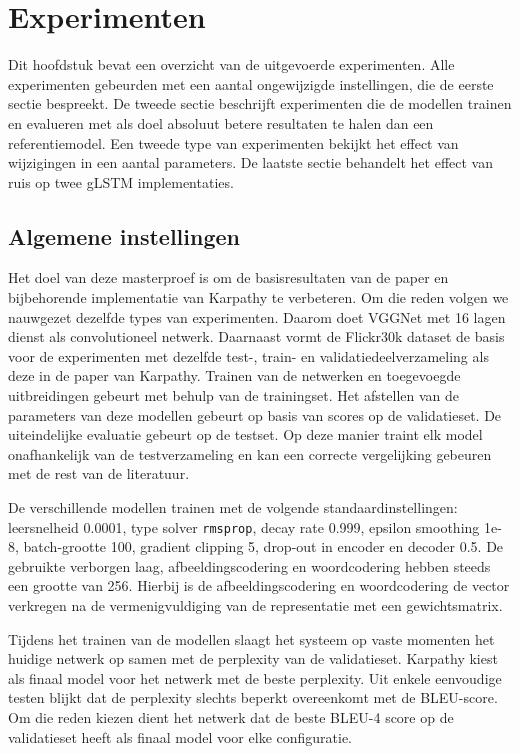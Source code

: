 \chapter{Experimenten} %
\label{cha:experimenten}
Dit hoofdstuk bevat een overzicht van de uitgevoerde experimenten. Alle experimenten gebeurden met een aantal ongewijzigde instellingen, die de eerste sectie bespreekt. De tweede sectie beschrijft experimenten die de modellen trainen en evalueren met als doel absoluut betere resultaten te halen dan een referentiemodel. Een tweede type van experimenten bekijkt het effect van wijzigingen in een aantal parameters. De laatste sectie behandelt het effect van ruis op twee gLSTM implementaties.

\section{Algemene instellingen} %
\label{sec:eigen_implementaties_exp}
Het doel van deze masterproef is om de basisresultaten van de paper en bijbehorende implementatie van Karpathy\cite{Karpathy2015} te verbeteren. Om die reden volgen we nauwgezet dezelfde types van experimenten. Daarom doet VGGNet met 16 lagen dienst als convolutioneel netwerk. Daarnaast vormt de  Flickr30k dataset de basis voor de experimenten met dezelfde test-, train- en validatiedeelverzameling als deze in de paper van Karpathy. Trainen van de netwerken en toegevoegde uitbreidingen gebeurt met behulp van de trainingset. Het afstellen van de parameters van deze modellen gebeurt op basis van scores op de validatieset. De uiteindelijke evaluatie gebeurt op de testset. Op deze manier traint elk model onafhankelijk van de testverzameling en kan een correcte vergelijking gebeuren met de rest van de literatuur.

De verschillende modellen trainen met de volgende standaardinstellingen: leersnelheid 0.0001, type solver \texttt{rmsprop}, decay rate 0.999, epsilon smoothing 1e-8, batch-grootte 100, gradient clipping 5, drop-out in encoder en decoder 0.5.
De gebruikte verborgen laag, afbeeldingscodering en woordcodering hebben steeds een grootte van 256. Hierbij is de afbeeldingscodering en woordcodering de vector verkregen na de vermenigvuldiging van de representatie met een gewichtsmatrix.

Tijdens het trainen van de modellen slaagt het systeem op vaste momenten het huidige netwerk op samen met de perplexity van de validatieset. Karpathy kiest als finaal model voor het netwerk met de beste perplexity. Uit enkele eenvoudige testen blijkt dat de perplexity slechts beperkt overeenkomt met de BLEU-score. Om die reden kiezen dient het netwerk dat de beste BLEU-4 score op de validatieset heeft als finaal model voor elke configuratie.

